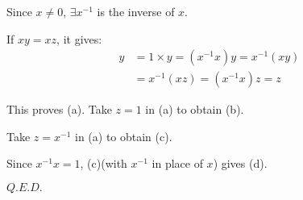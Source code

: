 \begin{Proof}
Since $x\neq0$, $\exists x^{-1}$ is the inverse of $x$. 

If $xy=xz$, it gives:
\begin{align*}
y &=1\times y=(x^{-1} x)y=x^{-1}(xy) \\
  &=x^{-1}(xz)=(x^{-1}x)z=z
\end{align*}

This proves (a). Take $z=1$ in (a) to obtain (b).

Take $z=x^{-1}$ in (a) to obtain (c).

Since $x^{-1}x=1$, (c)(with $x^{-1}$ in place of $x$) gives (d).

\hfill$Q.E.D.$\qedhere\hspace{42pt}
\end{Proof}
\newpage